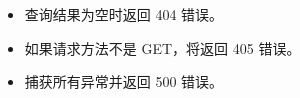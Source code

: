 \documentclass[a4paper,12pt,english]{sphinxmanual}
\begin{document}
\begin{fulllineitems}
\begin{description}
\begin{sphinxVerbatim}[commandchars=\\\{\}]
     
\end{sphinxVerbatim}

\begin{itemize}
\item {} 
\sphinxAtStartPar
查询结果为空时返回 404 错误。

\item {} 
\sphinxAtStartPar
如果请求方法不是 GET，将返回 405 错误。

\item {} 
\sphinxAtStartPar
捕获所有异常并返回 500 错误。

\end{itemize}

\end{description}

\end{fulllineitems}

\end{document}
